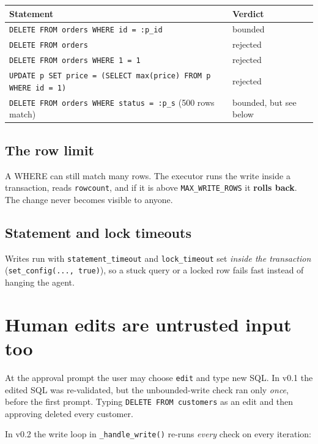 \documentclass[11pt,a4paper]{article}
\begin{document}
\begin{center}
\begin{tabular}{@{}p{9.3cm}l@{}}
\toprule
\textbf{Statement} & \textbf{Verdict} \\
\midrule
\texttt{DELETE FROM orders WHERE id = :p\_id}                         & bounded \\
\texttt{DELETE FROM orders}                                           & rejected \\
\texttt{DELETE FROM orders WHERE 1 = 1}                               & rejected \\
\texttt{UPDATE p SET price = (SELECT max(price) FROM p WHERE id = 1)} & rejected \\
\texttt{DELETE FROM orders WHERE status = :p\_s} (500 rows match)     & bounded, but see below \\
\bottomrule
\end{tabular}
\end{center}

\subsection*{The row limit}
A WHERE can still match many rows. The executor runs the write inside a
transaction, reads \texttt{rowcount}, and if it is above
\texttt{MAX\_WRITE\_ROWS} it \textbf{rolls back}. The change never becomes
visible to anyone.

\subsection*{Statement and lock timeouts}
Writes run with \texttt{statement\_timeout} and \texttt{lock\_timeout} set
\emph{inside the transaction} (\texttt{set\_config(..., true)}), so a stuck
query or a locked row fails fast instead of hanging the agent.

\section{Human edits are untrusted input too}
\label{sec:edits}

At the approval prompt the user may choose \texttt{edit} and type new SQL.
In v0.1 the edited SQL was re-validated, but the unbounded-write check ran
only \emph{once}, before the first prompt. Typing
\texttt{DELETE FROM customers} as an edit and then approving deleted every
customer.

In v0.2 the write loop in \texttt{\_handle\_write()} re-runs \emph{every}
check on every iteration:
\end{document}
